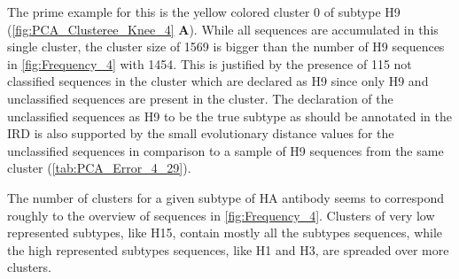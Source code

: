 The prime example for this is the yellow colored cluster 0 of subtype H9 (\autoref{fig:PCA_Clusteree_Knee_4} \textbf{\textsf{A}}). While all sequences are accumulated in this single cluster, the cluster size of 1569 is bigger than the number of H9 sequences in \autoref{fig:Frequency_4} with 1454. This is justified by the presence of 115 not classified sequences in the cluster which are declared as H9 since only H9 and unclassified sequences are present in the cluster. The declaration of the unclassified sequences as H9 to be the true subtype as should be annotated in the \gls{IRD} is also supported by the small evolutionary distance values for the unclassified sequences in comparison to a sample of H9 sequences from the same cluster (\autoref{tab:PCA_Error_4_29}).

The number of clusters for a given subtype of \gls{HA} antibody seems to correspond roughly to the overview of sequences in \autoref{fig:Frequency_4}. Clusters of very low represented subtypes, like H15, contain mostly all the subtypes sequences, while the high represented subtypes sequences, like H1 and H3, are spreaded over more clusters.

